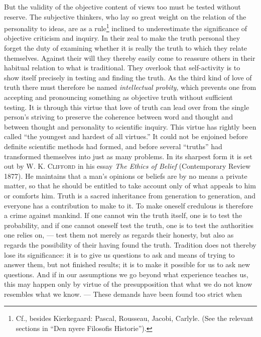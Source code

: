 \documentclass[12pt,a4paper,openany]{book}
\newcommand{\opage}[1]{\marginnote{\footnotesize\textit{[#1]}}}
\begin{document}
But the validity of the objective content of views too must be tested without reserve. The subjective thinkers, who lay
so great weight on the relation of the personality to ideas, are as a rule\footnote[1]{Cf., besides Kierkegaard:
Pascal, Rousseau, Jacobi, Carlyle. (See the relevant sections in ``Den nyere Filosofis Historie'').} inclined to
underestimate the significance of objective criticism and inquiry. In their zeal to make the truth personal they forget
the duty of examining whether it is really the truth to which they relate themselves. Against their will they thereby
easily come to reassure others in their habitual relation to what is traditional. They overlook that self-activity is
to show itself precisely in testing and finding the truth. As the third kind of love of truth there must therefore be
named \textit{intellectual probity,} which prevents one from accepting and pronouncing something as objective truth
without sufficient testing. It is through this virtue that love of truth can lead over from the single person's
striving to preserve the coherence between word and thought and between thought and personality to scientific inquiry.
This virtue has rightly been called ``the youngest and hardest of all virtues.'' It could not be enjoined before
definite scientific methods had formed, and before several ``truths'' had transformed themselves into just as many
problems. In its sharpest form it is set out by W. K. \textsc{Clifford} in his essay \textit{The Ethics of Belief}
(Contemporary Review 1877). He maintains that a man's opinions or beliefs are by no means a private matter, so that he
should be entitled to take account only of what appeals to him or comforts him. Truth is a sacred inheritance from
generation to generation, and everyone has a contribution to make to it. To make oneself credulous is therefore a crime
against
\opage{255}mankind. If one cannot win the truth itself, one is to test the probability, and if one cannot oneself test
the truth, one is to test the authorities one relies on, --- test them not merely as regards their honesty, but also as
regards the possibility of their having found the truth. Tradition does not thereby lose its significance: it is to
give us questions to ask and means of trying to answer them, but not finished results; it is to make it possible for us
to ask new questions. And if in our assumptions we go beyond what experience teaches us, this may happen only by virtue
of the presupposition that what we do not know resembles what we know. --- These demands have been found too strict when
\end{document}
